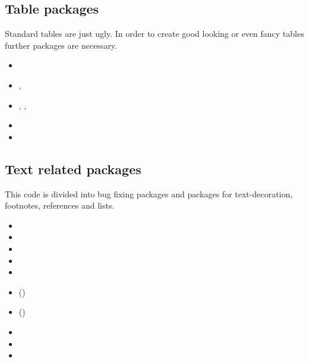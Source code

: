 
\subsection{Table packages}
\label{sec:packages:tables}

Standard \latex tables are just ugly. In order to create good looking or even fancy tables further packages are necessary.

\begin{itemize}[noitemsep]
\item {}
\item {}, 
\item {}, , 
\item {}
\item {}
\end{itemize}
 

\subsection{Text related packages}
\label{sec:packages:text}

This code is divided into bug fixing packages and packages for text-decoration, footnotes, references and lists.

\begin{itemize}[noitemsep]
\item {}
\item {}
\item {}
\item {}
\item {}
\item ()
\item ()
\item {}
\item {}
\item {}
\end{itemize}

